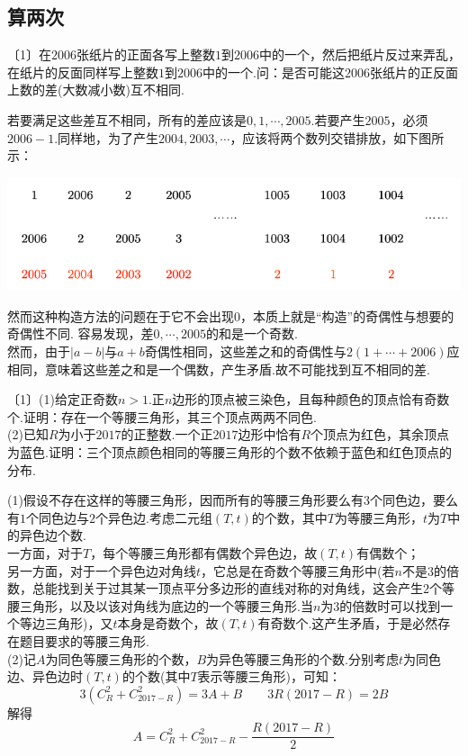\documentclass[cn,hazy,black,10pt,normal]{elegantnote}
\newenvironment{guess}{
  \color{guess}}{\newline \color{black}}
\newcommand{\nd}[1]{〔#1〕}
\begin{document}
\subsection{算两次}

\begin{problem} %
	\nd{1}在$2006$张纸片的正面各写上整数$1$到$2006$中的一个，然后把纸片反过来弄乱，在纸片的反面同样写上整数$1$到$2006$中的一个.问：是否可能这$2006$张纸片的正反面上数的差(大数减小数)互不相同.
\end{problem}
\begin{solution}
	\begin{guess}
		若要满足这些差互不相同，所有的差应该是$0,1, \cdots ,2005$.若要产生$2005$，必须$2006-1$.同样地，为了产生$2004,2003, \cdots$，应该将两个数列交错排放，如下图所示：
		\begin{center}
			\includegraphics{attachment/202302081.pdf}
		\end{center}
		然而这种构造方法的问题在于它不会出现$0$，本质上就是“构造”的奇偶性与想要的奇偶性不同.
	\end{guess}
	容易发现，差$0, \cdots ,2005$的和是一个奇数. \\
	然而，由于$|a-b|$与$a+b$奇偶性相同，这些差之和的奇偶性与$2(1+ \cdots +2006)$应相同，意味着这些差之和是一个偶数，产生矛盾.故不可能找到互不相同的差.
\end{solution}

\begin{problem} %
	\nd{1}(1)给定正奇数$n>1$.正$n$边形的顶点被三染色，且每种颜色的顶点恰有奇数个.证明：存在一个等腰三角形，其三个顶点两两不同色. \\
	(2)已知$R$为小于$2017$的正整数.一个正$2017$边形中恰有$R$个顶点为红色，其余顶点为蓝色.证明：三个顶点颜色相同的等腰三角形的个数不依赖于蓝色和红色顶点的分布.
\end{problem}
\begin{solution}
	(1)假设不存在这样的等腰三角形，因而所有的等腰三角形要么有$3$个同色边，要么有$1$个同色边与$2$个异色边.考虑二元组$(T,t)$的个数，其中$T$为等腰三角形，$t$为$T$中的异色边个数. \\
	一方面，对于$T$，每个等腰三角形都有偶数个异色边，故$(T,t)$有偶数个； \\
	另一方面，对于一个异色边对角线$t$，它总是在奇数个等腰三角形中(若$n$不是$3$的倍数，总能找到关于过其某一顶点平分多边形的直线对称的对角线，这会产生$2$个等腰三角形，以及以该对角线为底边的一个等腰三角形.当$n$为$3$的倍数时可以找到一个等边三角形)，又$t$本身是奇数个，故$(T,t)$有奇数个.这产生矛盾，于是必然存在题目要求的等腰三角形. \\
	(2)记$A$为同色等腰三角形的个数，$B$为异色等腰三角形的个数.分别考虑$t$为同色边、异色边时$(T,t)$的个数(其中$T$表示等腰三角形)，可知：
	$$3(C_R^2 + C_{2017-R}^2)=3A+B \qquad 3R(2017-R) = 2B$$
	解得$$A=C_R^2 + C_{2017-R}^2 - \dfrac{R(2017-R)}{2}$$
\end{solution}
\end{document}
